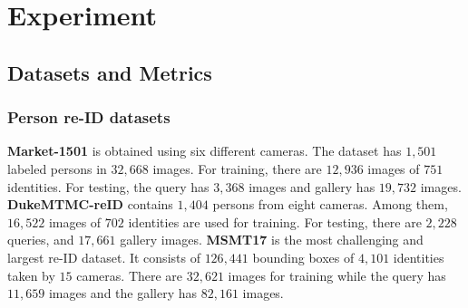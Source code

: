 \documentclass[journal]{IEEEtran}
\begin{document}
\section{Experiment}
\subsection{Datasets and Metrics}
\subsubsection{Person re-ID datasets}
\textbf{Market-1501} \cite{zheng2015scalable} is obtained using six different cameras. The dataset has $1,501$ labeled persons in $32,668$ images. For training, there are $12,936$ images of $751$ identities. For testing, the query has $3,368$ images and gallery has $19,732$ images. \textbf{DukeMTMC-reID} \cite{zheng2017unlabeled} contains $1,404$ persons from eight cameras. Among them, $16,522$ images of $702$ identities are used for training. For testing, there are $2,228$ queries, and $17,661$ gallery images. \textbf{MSMT17} \cite{wei2018person} is the most challenging and largest re-ID dataset. It consists of $126,441$ bounding boxes of $4,101$ identities taken by $15$ cameras. There are $32,621$ images for training while the query has $11,659$ images and the gallery has $82,161$ images. 
\end{document}
